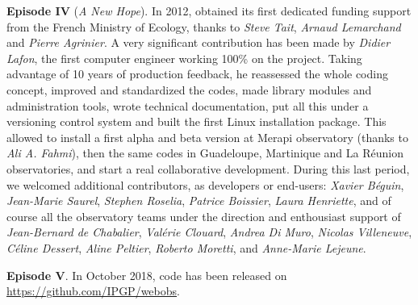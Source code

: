 \textbf{Episode IV} (\textit{A New Hope}). In 2012, \webobs obtained its first dedicated funding support from the French Ministry of Ecology, thanks to \textit{Steve Tait}, \textit{Arnaud Lemarchand} and \textit{Pierre Agrinier}. A very significant contribution has been made by \textit{Didier Lafon}, the first computer engineer working 100\% on the project. Taking advantage of 10 years of production feedback, he reassessed the whole coding concept, improved and standardized the codes, made library modules and administration tools, wrote technical documentation, put all this under a versioning control system and built the first Linux installation package. This allowed to install a first alpha and beta version at Merapi observatory (thanks to \textit{Ali A. Fahmi}), then the same codes in Guadeloupe, Martinique and La Réunion observatories, and start a real collaborative development. During this last period, we welcomed additional contributors, as developers or end-users: \textit{Xavier Béguin}, \textit{Jean-Marie Saurel}, \textit{Stephen Roselia}, \textit{Patrice Boissier}, \textit{Laura Henriette}, and of course all the observatory teams under the direction and enthousiast support of \textit{Jean-Bernard de Chabalier}, \textit{Valérie Clouard}, \textit{Andrea Di Muro}, \textit{Nicolas Villeneuve}, \textit{Céline Dessert}, \textit{Aline Peltier}, \textit{Roberto Moretti}, and \textit{Anne-Marie Lejeune}.

\textbf{Episode V}. In October 2018, \webobs code has been released on \url{https://github.com/IPGP/webobs}.